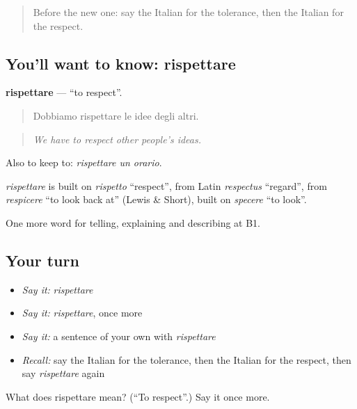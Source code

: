 \begin{quote}
Before the new one: say the Italian for the tolerance, then the Italian for the respect.
\end{quote}

\subsection*{You'll want to know: rispettare}
\textbf{rispettare} — \textquotedblleft{}to respect\textquotedblright{}.

\begin{quote}
Dobbiamo rispettare le idee degli altri.
\end{quote}

\begin{quote}
\emph{We have to respect other people's ideas.}
\end{quote}

Also to keep to: \emph{rispettare un orario}.

\begin{cousinweb}
\emph{rispettare} is built on \emph{rispetto} \textquotedblleft{}respect\textquotedblright{}, from Latin \emph{respectus} \textquotedblleft{}regard\textquotedblright{}, from \emph{respicere} \textquotedblleft{}to look back at\textquotedblright{} (Lewis \& Short), built on \emph{specere} \textquotedblleft{}to look\textquotedblright{}.
\end{cousinweb}

\begin{grammarlens}[title={What you've built}]
One more word for telling, explaining and describing at B1.
\end{grammarlens}

\subsection*{Your turn}
\begin{itemize}
\raggedright
  \item \emph{Say it:} \emph{rispettare}
  \item \emph{Say it:} \emph{rispettare}, once more
  \item \emph{Say it:} a sentence of your own with \emph{rispettare}
  \item \emph{Recall:} say the Italian for the tolerance, then the Italian for the respect, then say \emph{rispettare} again
\end{itemize}

\begin{tcolorbox}[breakable,colback=teal!4,colframe=teal!35!black,title={Before you move on}]
What does rispettare mean? (\textquotedblleft{}To respect\textquotedblright{}.) Say it once more.
\end{tcolorbox}

